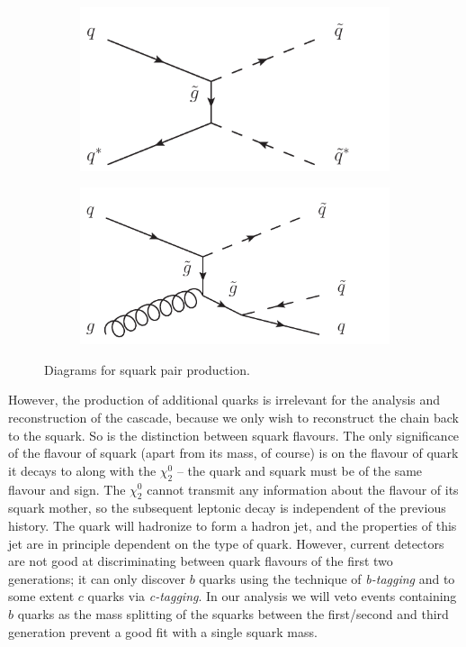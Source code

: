 \documentclass[twoside,english]{uiofysmaster}
\begin{document}
\begin{figure}[hbt]
	\begin{subfigure}[b]{0.4\textwidth}
		\includegraphics[width=\textwidth]{figures/qqbar_to_tildeqqbar.pdf} 
		\caption{ }
	\end{subfigure}
	\begin{subfigure}[b]{0.4\textwidth}
		\includegraphics[width=\textwidth]{figures/qg_to_tildeqqbar.pdf}
		\caption{ } 
	\end{subfigure}
	\caption{Diagrams for squark pair production.}
	\label{fig:squark_production_diagrams}
\end{figure}

However, the production of additional quarks is irrelevant for the analysis and reconstruction of the cascade, because we only wish to reconstruct the chain back to the squark. So is the distinction between squark flavours. The only significance of the flavour of squark (apart from its mass, of course) is on the flavour of quark it decays to along with the $\chi_2^0$ -- the quark and squark must be of the same flavour and sign. The $\chi_2^0$ cannot transmit any information about the flavour of its squark mother, so the subsequent leptonic decay is independent of the previous history. The quark will hadronize to form a hadron jet, and the properties of this jet are in principle dependent on the type of quark. However, current detectors are not good at discriminating between quark flavours of the first two generations; it can only discover $b$ quarks using the technique of {\it b-tagging} and to some extent $c$ quarks via {\it c-tagging}. In our analysis we will veto events containing $b$ quarks as the mass splitting of the squarks between the first/second and third generation prevent a good fit with a single squark mass.
\end{document}
